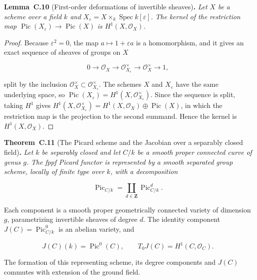 \documentclass[11pt]{article}
\newenvironment{bpstatement}[2]{\par\addvspace{0.6\baselineskip}\noindent\textbf{#1}#2\textbf{.}\enspace\ignorespaces}
  {\par\addvspace{0.4\baselineskip}}
\newenvironment{bpstatementit}[2]{\begin{bpstatement}{#1}{#2}\itshape\ignorespaces}{\end{bpstatement}}
\begin{document}
\label{bp34}%
\begin{bpstatementit}{Lemma~C.10}{ (First-order deformations of invertible sheaves)}
Let \(X\) be a scheme over a field \(k\) and \(X_\varepsilon=X\times_k\operatorname{Spec}k[\varepsilon]\). The kernel of the restriction map \(\operatorname{Pic}(X_\varepsilon)\to\operatorname{Pic}(X)\) is \(H^1(X,\mathcal O_X)\).
\end{bpstatementit}

\begin{proof}[{Proof}]\label{bp35}%
Because \(\varepsilon^2=0\), the map \(a\mapsto1+\varepsilon a\) is a homomorphism, and it gives an exact sequence of sheaves of groups on \(X\)

\[
0\longrightarrow\mathcal O_X\longrightarrow
\mathcal O_{X_\varepsilon}^\times\longrightarrow\mathcal O_X^\times
\longrightarrow1,
\]

split by the inclusion \(\mathcal O_X^\times\subset
\mathcal O_{X_\varepsilon}^\times\). The schemes \(X\) and \(X_\varepsilon\) have the same underlying space, so \(\operatorname{Pic}(X_\varepsilon)=H^1(X,\mathcal O_{X_\varepsilon}^\times)\). Since the sequence is split, taking \(H^1\) gives \(H^1(X,\mathcal O_{X_\varepsilon}^\times)=H^1(X,\mathcal O_X)\oplus\operatorname{Pic}(X)\), in which the restriction map is the projection to the second summand. Hence the kernel is \(H^1(X,\mathcal O_X)\).
\end{proof}

\label{bp36}%
\begin{bpstatementit}{Theorem~C.11}{ (The Picard scheme and the Jacobian over a separably closed field)}
Let \(k\) be separably closed and let \(C/k\) be a smooth proper connected curve of genus \(g\). The fppf Picard functor is represented by a smooth separated group scheme, locally of finite type over \(k\), with a decomposition

\[
\operatorname{Pic}_{C/k}
=\coprod_{d\in\mathbf Z}\operatorname{Pic}^d_{C/k}.
\]

Each component is a smooth proper geometrically connected variety of dimension \(g\), parametrizing invertible sheaves of degree \(d\). The identity component \(J(C)=\operatorname{Pic}^0_{C/k}\) is an abelian variety, and

\[
J(C)(k)=\operatorname{Pic}^0(C),
\qquad T_0J(C)=H^1(C,\mathcal O_C).
\]

The formation of this representing scheme, its degree components and \(J(C)\) commutes with extension of the ground field.
\end{bpstatementit}
\end{document}
